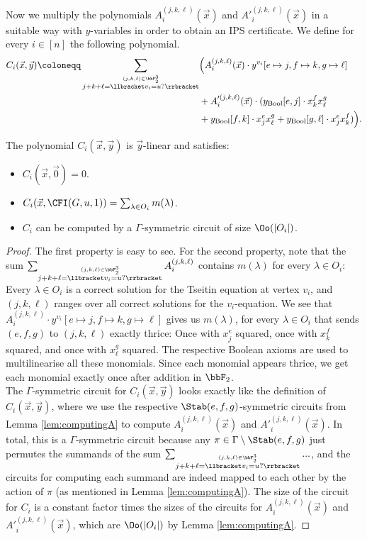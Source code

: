 \documentclass[a4paper,UKenglish,cleveref, autoref, thm-restate]{lipics-v2021}
\begin{document}
Now we multiply the polynomials $A^{(j,k,\ell)}_i(\vec x)$ and $A'^{(j,k,\ell)}_i(\vec x)$ in a suitable way with $y$-variables in order to obtain an IPS certificate. We define for every $i \in [n]$ the following polynomial.
\begin{align*}
	C_i(\vec x, \vec y) \coloneqq \sum_{\stackrel{(j,k,\ell) \in \bbF_2^3}{j+k+\ell = \llbracket v_i = u? \rrbracket}} &\Big(A^{(j,k,\ell)}_i(\vec x) \cdot y^{v_i}[e \mapsto j, f \mapsto k, g \mapsto \ell]\\
	&+ A'^{(j,k,\ell)}_i(\vec x) \cdot (y_{\text{Bool}}[e,j] \cdot x^f_kx^g_\ell \\
	&+ y_{\text{Bool}}[f,k]\cdot x^e_jx^g_\ell+ y_{\text{Bool}}[g,\ell]\cdot x^e_jx^f_k ) \Big).
\end{align*}
\begin{lemma}
	\label{lem:Ccomputable}
	The polynomial $C_i(\vec x, \vec y)$ is $\vec y$-linear and satisfies:
	\begin{itemize}
		\item $C_i(\vec x, \vec 0) = 0$.
		\item $C_i(\vec x, \CFI(G,u,1)) = \sum_{\lambda \in O_i} m(\lambda)$. 
		\item $C_i$ can be computed by a $\Gamma$-symmetric circuit of size $\Oo(|O_i|)$.
	\end{itemize}
\end{lemma}	
\begin{proof}
	The first property is easy to see. For the second property, note that the sum $\sum_{\stackrel{(j,k,\ell) \in \bbF_2^3}{j+k+\ell = \llbracket v_i = u? \rrbracket}} A^{(j,k,\ell)}_i$ contains $m(\lambda)$ for every $\lambda \in O_i$: Every $\lambda \in O_i$ is a correct solution for the Tseitin equation at vertex $v_i$, and $(j,k,\ell)$ ranges over all correct solutions for the $v_i$-equation.
	We see that $A^{(j,k,\ell)}_i \cdot y^{v_i}[e \mapsto j, f \mapsto k, g \mapsto \ell]$ gives us $m(\lambda)$, for every $\lambda \in O_i$ that sends $(e,f,g)$ to $(j,k,\ell)$ exactly thrice: Once with $x^e_j$ squared, once with $x^f_k$ squared, and once with $x^g_\ell$ squared. The respective Boolean axioms are used to multilinearise all these monomials. Since each monomial appears thrice, we get each monomial exactly once after addition in $\bbF_2$.\\
	The $\Gamma$-symmetric circuit for $C_i(\vec x, \vec y)$ looks exactly like the definition of $C_i(\vec x, \vec y)$, where we use the respective $\Stab(e,f,g)$-symmetric circuits from Lemma \ref{lem:computingA} to compute $A^{(j,k,\ell)}_i(\vec x)$ and $A'^{(j,k,\ell)}_i(\vec x)$. In total, this is a $\Gamma$-symmetric circuit because any $\pi \in \Gamma \setminus \Stab(e,f,g)$ just permutes the summands of the sum $\sum_{\stackrel{(j,k,\ell) \in \bbF_2^3}{j+k+\ell = \llbracket v_i = u? \rrbracket}} ...$, and the circuits for computing each summand are indeed mapped to each other by the action of $\pi$ (as mentioned in Lemma \ref{lem:computingA}). The size of the circuit for $C_i$ is a constant factor times the sizes of the circuits for $A^{(j,k,\ell)}_i(\vec x)$ and $A'^{(j,k,\ell)}_i(\vec x)$, which are $\Oo(|O_i|)$ by Lemma \ref{lem:computingA}. 
\end{proof}	
\end{document}
